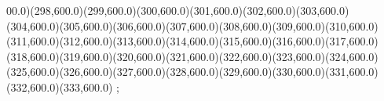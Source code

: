 {00.0)(298,600.0)(299,600.0)(300,600.0)(301,600.0)(302,600.0)(303,600.0)(304,600.0)(305,600.0)(306,600.0)(307,600.0)(308,600.0)(309,600.0)(310,600.0)(311,600.0)(312,600.0)(313,600.0)(314,600.0)(315,600.0)(316,600.0)(317,600.0)(318,600.0)(319,600.0)(320,600.0)(321,600.0)(322,600.0)(323,600.0)(324,600.0)(325,600.0)(326,600.0)(327,600.0)(328,600.0)(329,600.0)(330,600.0)(331,600.0)(332,600.0)(333,600.0)
};
